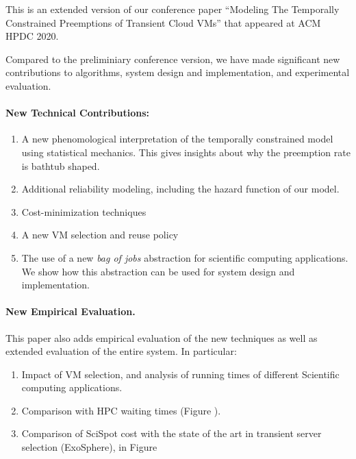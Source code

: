 \documentclass{article}
\begin{document}
This is an extended version of our conference paper ``Modeling The Temporally Constrained Preemptions of Transient Cloud VMs'' that appeared at ACM HPDC 2020. 

Compared to the preliminiary conference version, we have made significant new contributions to algorithms, system design and implementation, and experimental evaluation. 

\paragraph{New Technical Contributions:}

\begin{enumerate}
\item A new phenomological interpretation of the temporally constrained model using statistical mechanics. This gives insights about why the preemption rate is bathtub shaped.

\item Additional reliability modeling, including the hazard function of our model. 

\item Cost-minimization techniques 

\item A new VM selection and reuse policy 

\item The use of a new \emph{bag of jobs} abstraction for scientific computing applications. We show how this abstraction can be used for system design and implementation.

\end{enumerate}

\paragraph{New Empirical Evaluation.}
This paper also adds empirical evaluation of the new techniques as well as extended evaluation of the entire system. In particular:

\begin{enumerate}
\item Impact of VM selection, and analysis of running times of different Scientific computing applications. 
\item Comparison with HPC waiting times (Figure ). 
\item Comparison of SciSpot cost with the state of the art in transient server selection (ExoSphere), in Figure 
\end{enumerate}
\end{document}
